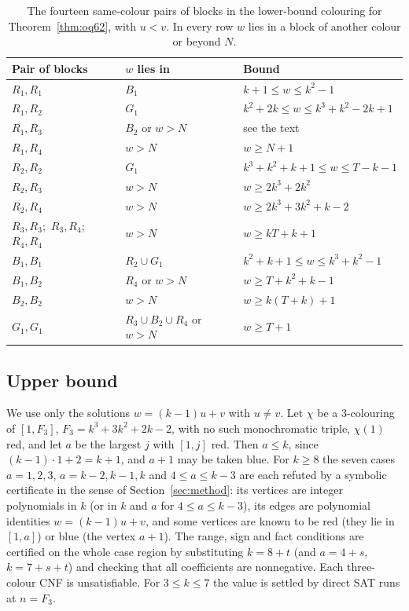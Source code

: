 \documentclass[11pt]{amsart}
\theoremstyle{definition}
\begin{document}
\begin{table}[ht]
\centering\small
\begin{tabular}{@{}lll@{}}
\toprule
Pair of blocks & $w$ lies in & Bound \\
\midrule
$R_1,R_1$ & $B_1$ & $k+1\le w\le k^2-1$ \\
$R_1,R_2$ & $G_1$ & $k^2+2k\le w\le k^3+k^2-2k+1$ \\
$R_1,R_3$ & $B_2$ or $w>N$ & see the text \\
$R_1,R_4$ & $w>N$ & $w\ge N+1$ \\
$R_2,R_2$ & $G_1$ & $k^3+k^2+k+1\le w\le T-k-1$ \\
$R_2,R_3$ & $w>N$ & $w\ge2k^3+2k^2$ \\
$R_2,R_4$ & $w>N$ & $w\ge2k^3+3k^2+k-2$ \\
$R_3,R_3$;\ $R_3,R_4$;\ $R_4,R_4$ & $w>N$ & $w\ge kT+k+1$ \\
\midrule
$B_1,B_1$ & $R_2\cup G_1$ & $k^2+k+1\le w\le k^3+k^2-1$ \\
$B_1,B_2$ & $R_4$ or $w>N$ & $w\ge T+k^2+k-1$ \\
$B_2,B_2$ & $w>N$ & $w\ge k(T+k)+1$ \\
\midrule
$G_1,G_1$ & $R_3\cup B_2\cup R_4$ or $w>N$ & $w\ge T+1$ \\
\bottomrule
\end{tabular}
\caption{The fourteen same-colour pairs of blocks in the lower-bound colouring for Theorem~\ref{thm:oq62}, with $u<v$. In every row $w$ lies in a block of another colour or beyond $N$.}
\label{tab:seven-blocks}
\end{table}

\subsection*{Upper bound} We use only the solutions $w=(k-1)u+v$ with $u\ne v$. Let $\chi$ be a 3-colouring of $[1,F_3]$, $F_3=k^3+3k^2+2k-2$, with no such monochromatic triple, $\chi(1)$ red, and let $a$ be the largest $j$ with $[1,j]$ red. Then $a\le k$, since $(k-1)\cdot1+2=k+1$, and $a+1$ may be taken blue. For $k\ge8$ the seven cases $a=1,2,3$, $a=k-2,k-1,k$ and $4\le a\le k-3$ are each refuted by a symbolic certificate in the sense of Section~\ref{sec:method}: its vertices are integer polynomials in $k$ (or in $k$ and $a$ for $4\le a\le k-3$), its edges are polynomial identities $w=(k-1)u+v$, and some vertices are known to be red (they lie in $[1,a]$) or blue (the vertex $a+1$). The range, sign and fact conditions are certified on the whole case region by substituting $k=8+t$ (and $a=4+s$, $k=7+s+t$) and checking that all coefficients are nonnegative. Each three-colour CNF is unsatisfiable. For $3\le k\le7$ the value is settled by direct SAT runs at $n=F_3$.
\end{document}
